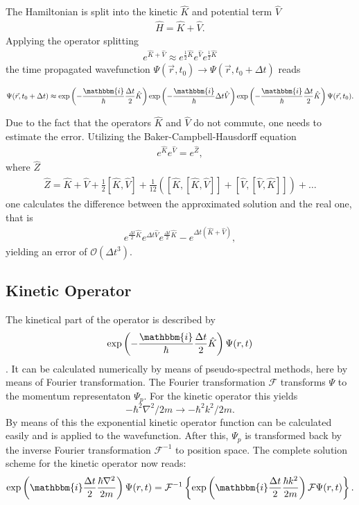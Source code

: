 \documentclass[12pt]{article}
\newcommand{\ic}{\mathbbm{i}}
\begin{document}
The Hamiltonian is split into the kinetic $\hat{K}$ and potential term $\hat{V}$ 
\begin{eqnarray}
\hat{H}=\hat{K}+\hat{V}.
\end{eqnarray}
Applying the operator splitting 
\begin{eqnarray}
  e^{\hat{K}+\hat{V}}\approx e^{\frac{1}{2}\hat{K}}e^{\hat{V}}e^{\frac{1}{2}\hat{K}}
\end{eqnarray}
the time propagated wavefunction $\Psi(\vec{r},t_0) \rightarrow \Psi(\vec{r},t_0+\Delta t)$ reads
\begin{tcolorbox}
\begin{eqnarray}
\Psi(\vec{r},t_0+\Delta t) \approx \exp\left(-\frac{\ic}{\hbar}\frac{\Delta t}{2}\hat{K}\right)
\exp\left(-\frac{\ic}{\hbar}\Delta t\hat{V}\right)\exp\left(-\frac{\ic}{\hbar}\frac{\Delta t}{2}\hat{K}\right)\Psi(\vec{r},t_0).
\end{eqnarray}
\end{tcolorbox}
Due to  the fact that the operators $\hat{K}$ and $\hat{V}$ do not commute, one needs to estimate the error. 
Utilizing the Baker-Campbell-Hausdorff equation
\begin{eqnarray}
e^{\hat{K}}e^ {\hat{V}}=e^{\hat{Z}},
\end{eqnarray} 
where $\hat{Z}$
\begin{eqnarray}
  \hat{Z}=\hat{K}+\hat{V}+\frac{1}{2}[\hat{K},\hat{V}]+\frac{1}{12}([\hat{K},
  [\hat{K},\hat{V}]]+[\hat{V},[\hat{V},\hat{K}]])+\ldots
\end{eqnarray}
one calculates the difference between the approximated solution and the real one, that is
\begin{eqnarray}
e^{\frac{\Delta t}{2} \hat{K}}e^{\Delta t \hat{V}}e^{\frac{\Delta t}{2} 
\hat{K}}-e^{\Delta t (\hat{K}+\hat{V})}, 
\end{eqnarray}
yielding an error of $\mathcal{O}(\Delta t^3)$.


\subsection{Kinetic Operator}
The kinetical part of the operator is described by 
$$\exp\left(-\frac{\ic}{\hbar}\frac{\Delta t}{2}\hat{K}\right) \Psi(r,t)$$.
It can be calculated numerically by means of pseudo-spectral methods, here by means of Fourier transformation. 
The Fourier transformation $\mathcal{F}$
transforms $\Psi$ to the momentum representaton $\Psi_p$.
For the kinetic operator this yields
$$-\hbar^2\nabla^2/2m\longrightarrow -\hbar^2k^2/2m.$$ 
By means of this the exponential kinetic operator function can be calculated easily and is applied to the wavefunction. 
After this, $\Psi_p$ is transformed back by the inverse Fourier transformation 
$\mathcal{F}^{-1}$ to position space. 
The complete solution scheme for the kinetic operator now reads:
\begin{eqnarray}
\exp\left(\ic\frac{\Delta t}{2}\frac{\hbar\nabla^2}{2m}\right)\Psi(r,t)=\mathcal{F}^{-1}
\left\{\exp\left(\ic\frac{\Delta t}{2}\frac{\hbar k^2}{2m}\right)\mathcal{F}\Psi(r,t)\right\}.
\end{eqnarray}
\end{document}
